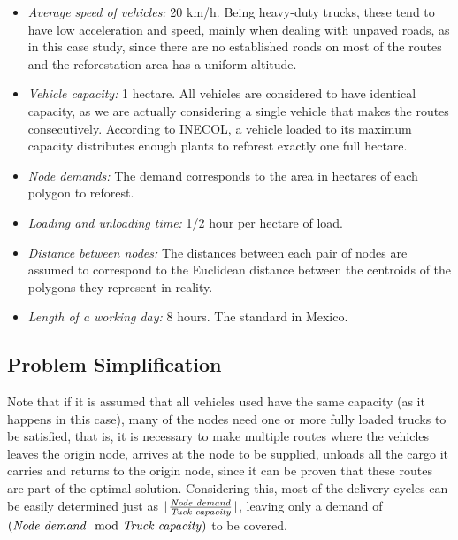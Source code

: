 \documentclass{amsart}
\begin{document}
    \begin{itemize}
        \item \textit{Average speed of vehicles:} 20 km/h. Being heavy-duty trucks, these tend to have low acceleration and speed, mainly when dealing with unpaved roads, as in this case study, since there are no established roads on most of the routes and the reforestation area has a uniform altitude.
        \item \textit{Vehicle capacity:} 1 hectare. All vehicles are considered to have identical capacity, as we are actually considering a single vehicle that makes the routes consecutively. According to INECOL, a vehicle loaded to its maximum capacity distributes enough plants to reforest exactly one full hectare.
        \item \textit{Node demands:} The demand corresponds to the area in hectares of each polygon to reforest.
        \item \textit{Loading and unloading time:} 1/2 hour per hectare of load.
        \item \textit{Distance between nodes:} The distances between each pair of nodes are assumed to correspond to the Euclidean distance between the centroids of the polygons they represent in reality.
        \item \textit{Length of a working day:} 8 hours. The standard in Mexico.
    \end{itemize}
    
    
    
    
    \subsection{Problem Simplification}
    
    Note that if it is assumed that all vehicles used have the same capacity (as it happens in this case), many of the nodes need one or more fully loaded trucks to be satisfied, that is, it is necessary to make multiple routes where the vehicles leaves the origin node, arrives at the node to be supplied, unloads all the cargo it carries and returns to the origin node, since it can be proven that these routes are part of the optimal solution. Considering this, most of the delivery cycles can be easily determined just as $\lfloor\frac{\text{\textit{Node demand}}}{\text{\textit{Tuck capacity}}}\rfloor$, leaving only a demand of $\left( \text{\textit{Node demand}} \mod \text{\textit{Truck capacity}} \right)$ to be covered.
    
\end{document}
